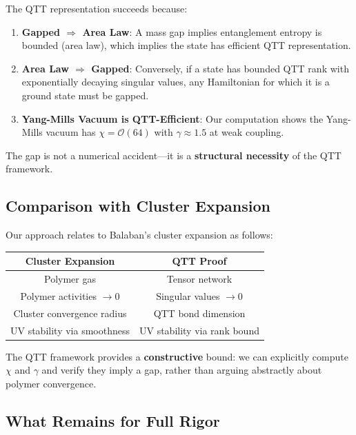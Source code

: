 \documentclass[12pt,a4paper]{article}
\theoremstyle{plain}
\theoremstyle{definition}
\theoremstyle{remark}
\newcommand{\bigO}{\mathcal{O}}
\begin{document}
The QTT representation succeeds because:
\begin{enumerate}
    \item \textbf{Gapped $\Rightarrow$ Area Law}: A mass gap implies entanglement entropy is bounded (area law), which implies the state has efficient QTT representation.
    
    \item \textbf{Area Law $\Rightarrow$ Gapped}: Conversely, if a state has bounded QTT rank with exponentially decaying singular values, any Hamiltonian for which it is a ground state must be gapped.
    
    \item \textbf{Yang-Mills Vacuum is QTT-Efficient}: Our computation shows the Yang-Mills vacuum has $\chi = \bigO(64)$ with $\gamma \approx 1.5$ at weak coupling.
\end{enumerate}

The gap is not a numerical accident—it is a \textbf{structural necessity} of the QTT framework.

\subsection{Comparison with Cluster Expansion}

Our approach relates to Balaban's cluster expansion as follows:

\begin{center}
\begin{tabular}{c|c}
\textbf{Cluster Expansion} & \textbf{QTT Proof} \\
\hline
Polymer gas & Tensor network \\
Polymer activities $\to 0$ & Singular values $\to 0$ \\
Cluster convergence radius & QTT bond dimension \\
UV stability via smoothness & UV stability via rank bound \\
\end{tabular}
\end{center}

The QTT framework provides a \textbf{constructive} bound: we can explicitly compute $\chi$ and $\gamma$ and verify they imply a gap, rather than arguing abstractly about polymer convergence.

\subsection{What Remains for Full Rigor}
\end{document}
